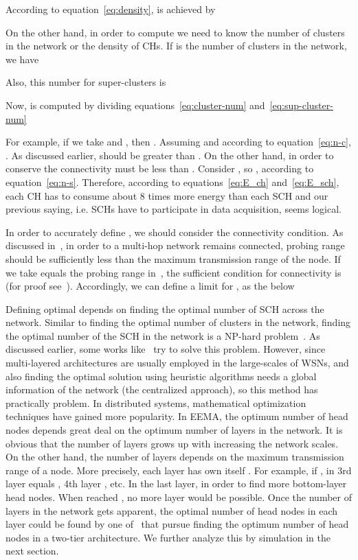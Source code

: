 \documentclass[journal]{IEEEtran}
\begin{document}
According to equation~\eqref{eq:density},  is achieved by

On the other hand, in order to compute  we need to know the number of clusters in the network or the density of CHs. 
If  is the number of clusters in the network, we have 

Also, this number for super-clusters is

Now,  is computed by dividing equations~\eqref{eq:cluster-num} and~\eqref{eq:sup-cluster-num}

For example, if we take  and , then .  Assuming  and according to equation~\eqref{eq:n-c}, .  As discussed earlier,  should be greater than .  On the other hand, in order to conserve the connectivity  must be less than .  Consider , so , according to equation~\eqref{eq:n-s}.  Therefore, according to equations~\eqref{eq:E_ch} and~\eqref{eq:E_sch}, each CH has to consume about 8 times more energy than each SCH and our previous saying, i.e. SCHs have to participate in data acquisition, seems logical.

In order to accurately define , we should consider the connectivity condition.  As discussed in~\cite{PEAS2003}, in order to a multi-hop network remains connected, probing range should be sufficiently less than the maximum transmission range of the node.  If we take  equals the probing range in~\cite{PEAS2003}, the sufficient condition for connectivity is  (for proof see~\cite{PEAS2003}).  Accordingly, we can define a limit for , as the below

Defining optimal  depends on finding the optimal number of SCH across the network.  Similar to finding the optimal number of clusters in the network, finding the optimal number of the SCH in the network is a NP-hard problem~\cite{brief-sur}.  As discussed earlier, some works like~\cite{karaki2004}\cite{karaki2009} try to solve this problem.  However, since multi-layered architectures are usually employed in the large-scales of WSNs, and also finding the optimal solution using heuristic algorithms needs a global information of the network (the centralized approach), so this method has practically problem.  In distributed systems, mathematical optimization techniques have gained more popularity.  In EEMA, the optimum number of head nodes depends great deal on the optimum number of layers in the network.  It is obvious that the number of layers grows up with increasing the network scales.  On the other hand, the number of layers depends on the maximum transmission range of a node.  More precisely, each layer has own itself .  For example, if ,  in 3rd layer equals , 4th layer , etc.  In the last layer,  in order to find more bottom-layer head nodes.  When  reached , no more layer would be possible.  Once the number of layers in the network gets apparent, the optimal number of head nodes in each layer could be found by one of~\cite{Heinzelman2002}\cite{opt-num-clu2004}\cite{optimalwang2009} that pursue finding the optimum number of head nodes in a two-tier architecture.  We further analyze this by simulation in the next section.
\end{document}
